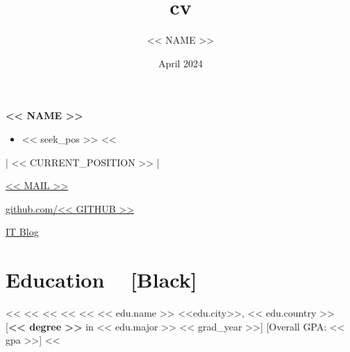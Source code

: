 \documentclass[10pt, a4paper]{article}
\title{cv}
\author{<< NAME >>}
\date{April 2024}
\newcommand{\myname}[1]{
        \color{black}
        \begin{center}
            {\LARGE \textbf{#1}}
        \end{center}
    }
\newcommand{\hl}[1]{{\color{Mahogany} #1}}
\newcommand{\mysec}[1]{\section*{\textbf{#1 ~} \xrfill[0.3\baselineskip]{0.1pt}[Black]}}
\newcommand{\myitemspace}{\setlength\itemsep{-2pt}}
\begin{document}

    \myname{<< NAME >>} %
    
    \begin{center}

        
        \parbox{0.85\linewidth}{
            \vspace{.75em} 
                \begin{itemize}
                    \myitemspace
                    <<%
                        \item << seek_pos >>
                    <<%
                \end{itemize}
            \vspace{1em}
        }
        
        | << CURRENT_POSITION >> | \\
        \vspace{.5em}

        \begin{linkset}
            \item \href{mailto:<< MAIL >>}{<< MAIL >>}
            \item \href{https://github.com/<< GITHUB >>}{github.com/<< GITHUB >>}
            \item \href{<< IT_BLOG >>}{IT Blog}
        \end{linkset}

    \end{center}

    
    \mysec{Education} %
        <<%
            <<%
            <<%
            <<%
            <<%
            \manyitem
                {<< edu.name >> \hfill \hl{<<edu.city>>, << edu.country >>}}
                [\textbf{<< degree >>} in << edu.major >> \hfill \small << grad_year >>]
                [Overall GPA: << gpa >>]
        <<%
\end{document}
